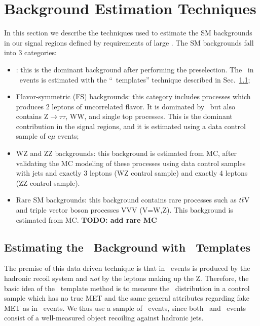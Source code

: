 \clearpage
\section{Background Estimation Techniques}
\label{sec:bkg}

In this section we describe the techniques used to estimate the SM backgrounds in our signal regions defined by requirements of large \MET.
The SM backgrounds fall into 3 categories:

\begin{itemize}
\item \zjets: this is the dominant background after performing the preselection. The \MET\ in \zjets\ events is estimated with the 
``\MET\ templates'' technique described in Sec.~\ref{sec:bkg_zjets};
\item Flavor-symmetric (FS) backgrounds: this category includes processes which produces 2 leptons of uncorrelated flavor. It is dominated
by \ttbar\ but also contains Z$\to\tau\tau$, WW, and single top processes. This is the dominant contribution in the signal regions, and it
is estimated using a data control sample of e$\mu$ events;
\item WZ and ZZ backgrounds: this background is estimated from MC, after validating the MC modeling of these processes using data control
samples with jets and exactly 3 leptons (WZ control sample) and exactly 4 leptons (ZZ control sample).
\item Rare SM backgrounds: this background contains rare processes such as $t\bar{t}$V and triple vector boson processes VVV (V=W,Z).
This background is estimated from MC. {\bf TODO: add rare MC}
\end{itemize}

\subsection{Estimating the \zjets\ Background with \MET\ Templates}
\label{sec:bkg_zjets}

The premise of this data driven technique is that \MET in \zjets\ events
is produced by the hadronic recoil system and {\it not} by the leptons making up the Z.
Therefore, the basic idea of the \MET\ template method is to measure the \MET\ distribution in 
a control sample which has no true MET and the same general attributes regarding
fake MET as in \zjets\ events. We thus use a sample of \gjets\ events, since both \zjets\
and \gjets\ events consist of a well-measured object recoiling against hadronic jets.

